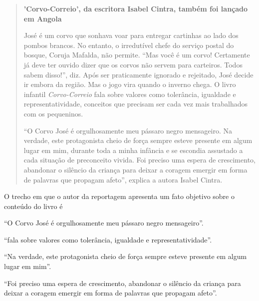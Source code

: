 \begin{quote}
\textbf{'Corvo-Correio', da escritora Isabel Cintra, também foi lançado 
em Angola}

José é um corvo que sonhava voar para entregar cartinhas ao lado dos
pombos brancos. No entanto, o irredutível chefe do serviço postal do
bosque, Coruja Mafalda, não permite. ``Mas você é um corvo! Certamente já
deve ter ouvido dizer que os corvos não servem para carteiros. Todos
sabem disso!'', diz. Após ser praticamente ignorado e rejeitado, José
decide ir embora da região. Mas o jogo vira quando o inverno chega. O
livro infantil \textit{Corvo-Correio} fala sobre valores como tolerância,
igualdade e representatividade, conceitos que precisam ser cada vez mais
trabalhados com os pequeninos.

``O Corvo José é orgulhosamente meu pássaro negro mensageiro. Na
verdade, este protagonista cheio de força sempre esteve presente em
algum lugar em mim, durante toda a minha infância e se escondia
assustado a cada situação de preconceito vivida. Foi preciso uma espera
de crescimento, abandonar o silêncio da criança para deixar a coragem
emergir em forma de palavras que propagam afeto'', explica a autora
Isabel Cintra.

\end{quote}

O trecho em que o autor da reportagem apresenta um fato objetivo sobre
o conteúdo do livro é

\begin{escolha}
\item ``O Corvo José é orgulhosamente meu pássaro negro mensageiro''.

\item ``fala sobre
valores como tolerância, igualdade e representatividade''.

\item ``Na verdade, este protagonista cheio de força sempre esteve
presente em algum lugar em mim''.

\item ``Foi preciso uma espera de crescimento, abandonar o silêncio da
criança para deixar a coragem emergir em forma de palavras que propagam
afeto''.
\end{escolha}

